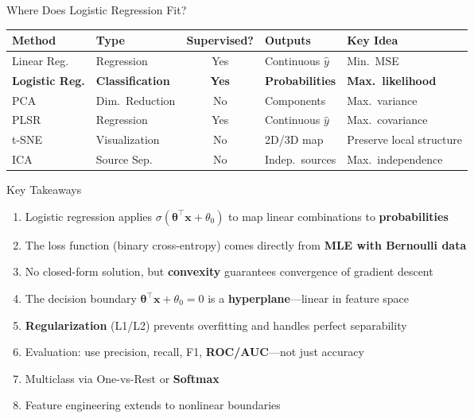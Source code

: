 \documentclass[aspectratio=169,11pt]{beamer}
\begin{document}
\begin{frame}{Where Does Logistic Regression Fit?}
\centering
\small
\begin{tabular}{llcll}
\toprule
\textbf{Method} & \textbf{Type} & \textbf{Supervised?} & \textbf{Outputs} & \textbf{Key Idea} \\
\midrule
Linear Reg. & Regression & Yes & Continuous $\hat{y}$ & Min.\ MSE \\
\textbf{Logistic Reg.} & \textbf{Classification} & \textbf{Yes} & \textbf{Probabilities} & \textbf{Max.\ likelihood} \\
PCA & Dim.\ Reduction & No & Components & Max.\ variance \\
PLSR & Regression & Yes & Continuous $\hat{y}$ & Max.\ covariance \\
t-SNE & Visualization & No & 2D/3D map & Preserve local structure \\
ICA & Source Sep. & No & Indep.\ sources & Max.\ independence \\
\bottomrule
\end{tabular}

\vspace{1em}
\end{frame}

\begin{frame}{Key Takeaways}
\begin{enumerate}
  \item Logistic regression applies $\sigma(\boldsymbol{\theta}^\top\boldsymbol{x}+\theta_0)$ to map linear combinations to \textbf{probabilities}
  \item The loss function (binary cross-entropy) comes directly from \textbf{MLE with Bernoulli data}
  \item No closed-form solution, but \textbf{convexity} guarantees convergence of gradient descent
  \item The decision boundary $\boldsymbol{\theta}^\top\boldsymbol{x}+\theta_0=0$ is a \textbf{hyperplane}---linear in feature space
  \item \textbf{Regularization} (L1/L2) prevents overfitting and handles perfect separability
  \item Evaluation: use precision, recall, F1, \textbf{ROC/AUC}---not just accuracy
  \item Multiclass via One-vs-Rest or \textbf{Softmax}
  \item Feature engineering extends to nonlinear boundaries
\end{enumerate}

\end{frame}

\end{document}
